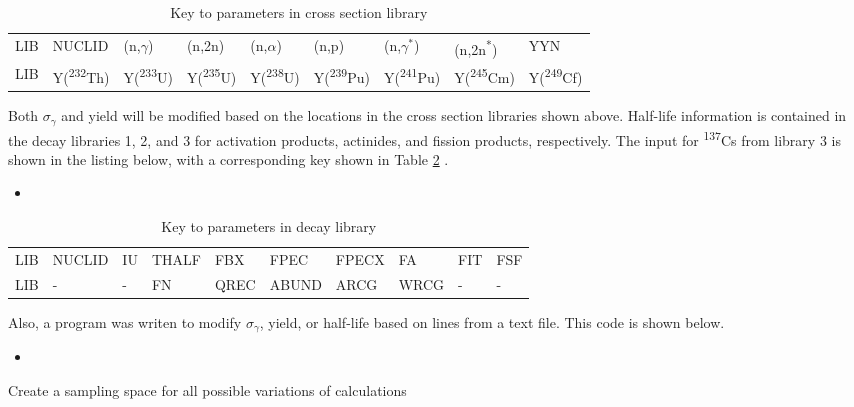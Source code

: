 \documentclass[11pt,notitlepage]{article}
\newcommand{\tss}{\textsuperscript}
\newcommand{\inputdeckpages}[4]{
\begin{itemize}
\item[]
\end{itemize}
}
\newcommand{\pythonscript}[2]{
\begin{itemize}
\item[]
\end{itemize}
}
\begin{document}
\begin{todolist}
  \begin{table}[H]
  \begin{center}
    \caption{Key to parameters in cross section library}
    \label{Table:2}
    \begin{tabular}{l l l l l l l l l}
      \toprule
      LIB & NUCLID & (n,$\gamma$) & (n,2n) & (n,$\alpha$) &
      (n,p) & (n,$\gamma^*$) & (n,2n\tss{*}) & YYN\\
      LIB & Y(\tss{232}Th) & Y(\tss{233}U) & Y(\tss{235}U) &
      Y(\tss{238}U) & Y(\tss{239}Pu) & Y(\tss{241}Pu) &
      Y(\tss{245}Cm) & Y(\tss{249}Cf)\\
      \bottomrule
    \end{tabular}
  \end{center}
  \end{table}

  Both $\sigma_\gamma$ and yield will be modified based on the
  locations in the cross section libraries shown above.
  Half-life information is contained in the decay
  libraries 1, 2, and 3 for activation products, actinides,
  and fission products, respectively. The input for \tss{137}Cs
  from library 3 is shown in the listing below, with
  a corresponding key shown in Table \ref{Table:3} \cite{croff1980user}.
  
  \inputdeckpages{../Origen2/TAPE9_BANK}{\tss{137}Cs cross section
  library 603 input}{2896}{2897}

  \begin{table}[H]
  \begin{center}
    \caption{Key to parameters in decay library}
    \label{Table:3}
    \begin{tabular}{l l l l l l l l l l}
      \toprule
      LIB & NUCLID & IU & THALF & FBX &
      FPEC & FPECX & FA & FIT & FSF\\
      LIB & - & - & FN & QREC &
      ABUND & ARCG & WRCG &
      -  & - \\
      \bottomrule
    \end{tabular}
  \end{center}
  \end{table}

  Also, a program was writen to modify $\sigma_\gamma$, yield,
  or half-life based on lines from a text file. This code is
  shown below.

  \pythonscript{../ChangeTAPE/change}{Script for modifying ORIGEN2 input.}

  
  
\item{Create a sampling space for all possible variations of
  calculations}


\end{todolist}
\end{document}
